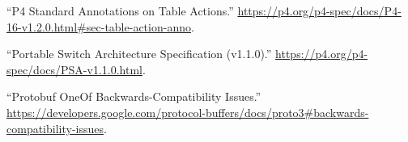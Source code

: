 \documentclass[11pt]{article}
\begin{document}
{{\begin{thebibliography}{39}
\mdbibitemlabel{{}[18]}\textquotedblleft{}P4 Standard Annotations on Table Actions.\textquotedblright{} \href{https://p4.org/p4-spec/docs/P4-16-v1.2.0.html\%23sec-table-action-anno}{{\ttfamily https://\hspace{0pt}p4.\hspace{0pt}org/\hspace{0pt}p4-\hspace{0pt}spec/\hspace{0pt}docs/\hspace{0pt}P4-\hspace{0pt}16-\hspace{0pt}v1.\hspace{0pt}2.\hspace{0pt}0.\hspace{0pt}html\#\hspace{0pt}sec-\hspace{0pt}table-\hspace{0pt}action-\hspace{0pt}anno}}.\label{p4actionannotations}%

\mdbibitemlabel{{}[19]}\textquotedblleft{}Portable Switch Architecture Specification (v1.1.0).\textquotedblright{} \href{https://p4.org/p4-spec/docs/PSA-v1.1.0.html}{{\ttfamily https://\hspace{0pt}p4.\hspace{0pt}org/\hspace{0pt}p4-\hspace{0pt}spec/\hspace{0pt}docs/\hspace{0pt}PSA-\hspace{0pt}v1.\hspace{0pt}1.\hspace{0pt}0.\hspace{0pt}html}}.\label{psa}%

\mdbibitemlabel{{}[20]}\textquotedblleft{}Protobuf OneOf Backwards-Compatibility Issues.\textquotedblright{} \href{https://developers.google.com/protocol-buffers/docs/proto3\%23backwards-compatibility-issues}{{\ttfamily https://\hspace{0pt}developers.\hspace{0pt}google.\hspace{0pt}com/\hspace{0pt}protocol-\hspace{0pt}buffers/\hspace{0pt}docs/\hspace{0pt}proto3\#\hspace{0pt}backwards-\hspace{0pt}compatibility-\hspace{0pt}issues}}.\label{protooneofbackwardscompatibility}%


\end{thebibliography}}}
\end{document}
